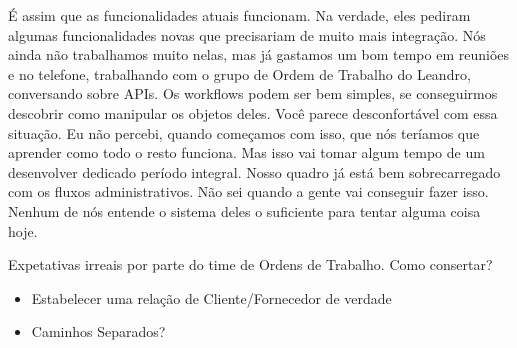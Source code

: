 \documentclass[12pt,play]{article}
\begin{document}
É assim que as funcionalidades atuais funcionam. Na verdade, eles pediram algumas funcionalidades novas que precisariam de muito mais integração. Nós ainda não trabalhamos muito nelas, mas já gastamos um bom tempo em reuniões e no telefone, trabalhando com o grupo de Ordem de Trabalho do Leandro, conversando sobre APIs. Os workflows podem ser bem simples, se conseguirmos descobrir como manipular os objetos deles.
\serg Você parece desconfortável com essa situação.
\paty Eu não percebi, quando começamos com isso, que nós teríamos que aprender como todo o resto funciona. Mas isso vai tomar algum tempo de um desenvolver dedicado período integral. Nosso quadro já está bem sobrecarregado com os fluxos administrativos. Não sei quando a gente vai conseguir fazer isso. Nenhum de nós entende o sistema deles o suficiente para tentar alguma coisa hoje.

\narr Expetativas irreais por parte do time de Ordens de Trabalho. Como consertar?
\begin{itemize}
	\item Estabelecer uma relação de Cliente/Fornecedor de verdade
	\item Caminhos Separados?
\end{itemize} 
\end{document}
